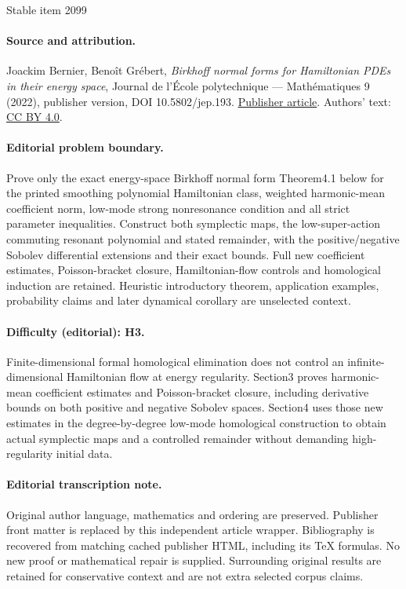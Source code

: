 \documentclass[11pt]{article}
\theoremstyle{definition}
\begin{document}
\begin{center}{\Large Stable item 2099}\end{center}
\paragraph{Source and attribution.}
Joackim Bernier, Benoît Grébert, \emph{Birkhoff normal forms for Hamiltonian PDEs in their energy space}, Journal de l’École polytechnique — Mathématiques 9 (2022), publisher version, DOI 10.5802/jep.193. \href{https://jep.centre-mersenne.org/articles/10.5802/jep.193/}{Publisher article}. Authors' text: \href{https://creativecommons.org/licenses/by/4.0/}{CC BY 4.0}.
\paragraph{Editorial problem boundary.}
Prove only the exact energy-space Birkhoff normal form Theorem4.1 below for the printed smoothing polynomial Hamiltonian class, weighted harmonic-mean coefficient norm, low-mode strong nonresonance condition and all strict parameter inequalities. Construct both symplectic maps, the low-super-action commuting resonant polynomial and stated remainder, with the positive/negative Sobolev differential extensions and their exact bounds. Full new coefficient estimates, Poisson-bracket closure, Hamiltonian-flow controls and homological induction are retained. Heuristic introductory theorem, application examples, probability claims and later dynamical corollary are unselected context.
\paragraph{Difficulty (editorial): H3.}
Finite-dimensional formal homological elimination does not control an infinite-dimensional Hamiltonian flow at energy regularity. Section3 proves harmonic-mean coefficient estimates and Poisson-bracket closure, including derivative bounds on both positive and negative Sobolev spaces. Section4 uses those new estimates in the degree-by-degree low-mode homological construction to obtain actual symplectic maps and a controlled remainder without demanding high-regularity initial data.
\paragraph{Editorial transcription note.}
Original author language, mathematics and ordering are preserved. Publisher front matter is replaced by this independent article wrapper. Bibliography is recovered from matching cached publisher HTML, including its TeX formulas. No new proof or mathematical repair is supplied. Surrounding original results are retained for conservative context and are not extra selected corpus claims.
\clearpage
\end{document}

